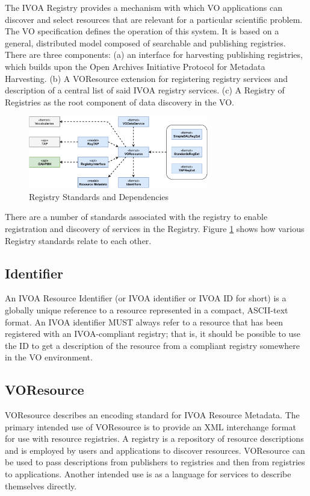 \documentclass[11pt,letter]{ivoa}
\begin{document}
The IVOA Registry provides a mechanism with which VO applications can
discover and select
resources that are relevant for a particular scientific problem. The VO
specification defines
the operation of this system. It is based on a general, distributed
model composed of searchable
and publishing registries. There are three components: (a) an interface
for harvesting publishing
registries, which builds upon the Open Archives Initiative Protocol for
Metadata Harvesting.
(b) A VOResource extension for registering registry services and
description of a central list
of said IVOA registry services. (c) A Registry of Registries as the root
component of data discovery
in the VO. 

\begin{figure}[ht]
\centering
\includegraphics[width=0.70\textwidth]{ivoa-arch-registry.pdf}
\caption{Registry Standards and Dependencies}
\label{fig:regdeps}
\end{figure}

There are a number of standards associated with the registry to enable
registration and discovery
of services in the Registry. Figure \ref{fig:regdeps} shows how various
Registry standards relate to each other.

\subsection{Identifier}

An IVOA Resource Identifier (or IVOA identifier or IVOA ID for short)
\citep{2016ivoa.spec.0523D} is a globally unique reference
to a resource represented in a compact, ASCII-text format. An IVOA
identifier MUST always refer to
a resource that has been registered with an IVOA-compliant registry;
that is, it should be possible
to use the ID to get a description of the resource from a compliant
registry somewhere in the VO
environment.

\subsection{VOResource}

VOResource \citep{2018ivoa.spec.0625P} describes an encoding standard
for IVOA Resource Metadata. The primary intended use of
VOResource is to provide an XML interchange format for use with resource
registries. A registry is
a repository of resource descriptions and is employed by users and
applications to discover resources.
VOResource can be used to pass descriptions from publishers to
registries and then from registries to
applications. Another intended use is as a language for services to
describe themselves directly.
\end{document}
